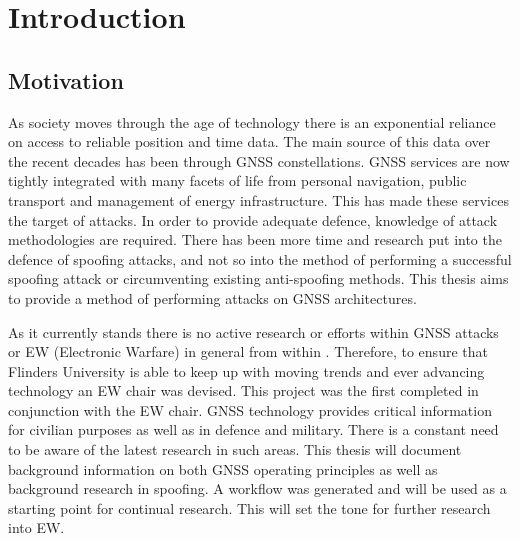 
\chapter{Introduction}\label{chapter:firstchapter} %

\label{Chapter1} %

\section{Motivation}\label{sec:Motivation}


As society moves through the age of technology there is an exponential reliance on access to reliable position and time data. The main source of this data over the
recent decades has been through GNSS constellations. GNSS services are now tightly integrated with many facets of life from personal navigation, public transport and
management of energy infrastructure. This has made these services the target of attacks. 
In order to provide adequate defence, knowledge of attack methodologies are
required. 
There has been more time and research put into the defence of spoofing attacks, and not so into the method of performing a successful spoofing attack or
circumventing existing anti-spoofing methods. This thesis aims to provide a method of performing attacks on GNSS architectures.

As it currently stands there is no active research or efforts within GNSS attacks or EW (Electronic Warfare) in general from within \univname. Therefore, to ensure that
Flinders University is able to keep up with moving trends and
ever advancing technology an EW chair was devised. This project was the first completed in conjunction with the EW chair. GNSS technology provides critical information for
civilian purposes as well as in defence and military. There is a constant need to be aware of the latest research in such areas.   
This thesis will document background information on both GNSS operating principles as well as background research in
spoofing. A workflow was generated and will be used as a starting point for continual research. This will set the tone for further research into EW.

